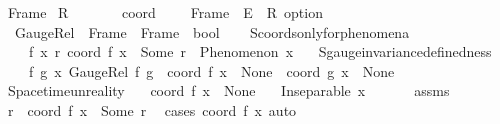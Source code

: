 \begin{isabellebody}
{}
\isamarkuptrue%
%
\endisatagdocument
{\isafolddocument}%
%
\isadelimdocument
%
\endisadelimdocument
{}\isamarkupfalse%
\ Frame\isanewline
{}\isamarkupfalse%
\ R{}\ \ \ \ \ \isanewline
\isanewline
{}\isamarkupfalse%
\isanewline
\ \ coord\ \ \ \ {\isacharcolon}{\kern0pt}{\isacharcolon}{\kern0pt}\ {\isachardoublequoteopen}Frame\ {\isasymRightarrow}\ E\ {\isasymRightarrow}\ R{}\ option{\isachardoublequoteclose}\isanewline
\ \ GaugeRel\ {\isacharcolon}{\kern0pt}{\isacharcolon}{\kern0pt}\ {\isachardoublequoteopen}Frame\ {\isasymRightarrow}\ Frame\ {\isasymRightarrow}\ bool{\isachardoublequoteclose}\isanewline
\isanewline
{}\isamarkupfalse%
\ \isanewline
\ \ S{}{\isacharunderscore}{\kern0pt}coords{\isacharunderscore}{\kern0pt}only{\isacharunderscore}{\kern0pt}for{\isacharunderscore}{\kern0pt}phenomena{\isacharcolon}{\kern0pt}\isanewline
\ \ \ \ {\isachardoublequoteopen}{\isasymforall}f\ x\ r{\isachardot}{\kern0pt}\ coord\ f\ x\ {\isacharequal}{\kern0pt}\ Some\ r\ {\isasymlongrightarrow}\ Phenomenon\ x{\isachardoublequoteclose}\ \isanewline
\ \ S{}{\isacharunderscore}{\kern0pt}gauge{\isacharunderscore}{\kern0pt}invariance{\isacharunderscore}{\kern0pt}definedness{\isacharcolon}{\kern0pt}\isanewline
\ \ \ \ {\isachardoublequoteopen}{\isasymforall}f\ g\ x{\isachardot}{\kern0pt}\ GaugeRel\ f\ g\ {\isasymlongrightarrow}\ {\isacharparenleft}{\kern0pt}coord\ f\ x\ {\isacharequal}{\kern0pt}\ None\ {\isasymlongleftrightarrow}\ coord\ g\ x\ {\isacharequal}{\kern0pt}\ None{\isacharparenright}{\kern0pt}{\isachardoublequoteclose}\isanewline
\isanewline
{}\isamarkupfalse%
\ Spacetime{\isacharunderscore}{\kern0pt}unreality{\isacharcolon}{\kern0pt}\isanewline
\ \ \ {\isachardoublequoteopen}coord\ f\ x\ {\isasymnoteq}\ None{\isachardoublequoteclose}\isanewline
\ \ \ {\isachardoublequoteopen}Inseparable\ x\ {\isasymOmega}{\isachardoublequoteclose}\isanewline
%
\isadelimproof
%
\endisadelimproof
%
\isatagproof
{}\isamarkupfalse%
\ {\isacharminus}{\kern0pt}\isanewline
\ \ \isamarkupfalse%
\ assms\ \isamarkupfalse%
\ r\ \ {\isachardoublequoteopen}coord\ f\ x\ {\isacharequal}{\kern0pt}\ Some\ r{\isachardoublequoteclose}\ \isamarkupfalse%
\ {\isacharparenleft}{\kern0pt}cases\ {\isachardoublequoteopen}coord\ f\ x{\isachardoublequoteclose}{\isacharparenright}{\kern0pt}\ auto\isanewline

\end{isabellebody}
